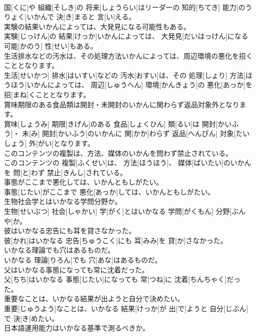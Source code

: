 \documentclass[8pt]{extreport}
\begin{document}
\begin{CJK}{UTF8}{min}
\\	国[くに]や 組織[そしき]の 将来[しょうらい]はリーダーの 知的[ちてき] 能力[のうりょく]いかんで 決[き]まると 言[い]える。
\\	実験の結果いかんによっては、大発見になる可能性もある。	
\\	実験[じっけん]の 結果[けっか]いかんによっては、 大発見[だいはっけん]になる 可能[かのう] 性[せい]もある。
\\	生活排水などの汚水は、その処理方法いかんによっては、周辺環境の悪化を招くこととなります。	
\\	生活[せいかつ] 排水[はいすい]などの 汚水[おすい]は、その 処理[しょり] 方法[ほうほう]いかんによっては、 周辺[しゅうへん] 環境[かんきょう]の 悪化[あっか]を 招[まね]くこととなります。
\\	賞味期限のある食品類は開封・未開封のいかんに関わらず返品対象外となります。	
\\	賞味[しょうみ] 期限[きげん]のある 食品[しょくひん] 類[るい]は 開封[かいふう]・ 未[み] 開封[かいふう]のいかんに 関[かか]わらず 返品[へんぴん] 対象[たいしょう] 外[がい]となります。
\\	このコンテンツの複製は、方法、媒体のいかんを問わず禁止されている。	
\\	このコンテンツの 複製[ふくせい]は、 方法[ほうほう]、 媒体[ばいたい]のいかんを 問[と]わず 禁止[きんし]されている。
\\	事態がここまで悪化しては、いかんともしがたい。	
\\	事態[じたい]がここまで 悪化[あっか]しては、いかんともしがたい。
\\	生物社会学とはいかなる学問分野か。	
\\	生物[せいぶつ] 社会[しゃかい] 学[がく]とはいかなる 学問[がくもん] 分野[ぶんや]か。
\\	彼はいかなる忠告にも耳を貸さなかった。	
\\	彼[かれ]はいかなる 忠告[ちゅうこく]にも 耳[みみ]を 貸[か]さなかった。
\\	いかなる理論でも穴はあるものだ。	
\\	いかなる 理論[りろん]でも 穴[あな]はあるものだ。
\\	父はいかなる事態になっても常に沈着だった。	
\\	父[ちち]はいかなる 事態[じたい]になっても 常[つね]に 沈着[ちんちゃく]だった。
\\	重要なことは、いかなる結果が出ようと自分で決めたい。	
\\	重要[じゅうよう]なことは、いかなる 結果[けっか]が 出[で]ようと 自分[じぶん]で 決[き]めたい。
\\	日本語運用能力はいかなる基準で測るべきか。	

\end{CJK}
\end{document}
